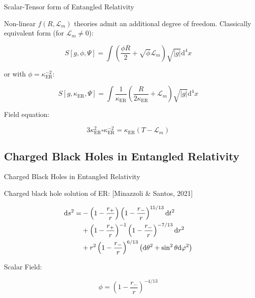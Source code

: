\documentclass{beamer}
\newcommand{\paren}[1]{\left( #1 \right)}
\newcommand{\bracket}[1]{\left[ #1 \right]}
\newcommand{\mrm}{\mathrm}
\newcommand{\mcal}{\mathcal}
\begin{document}
\begin{frame}{Scalar-Tensor form of Entangled Relativity}

    Non-linear $f(R, \mcal L_m)$ theories admit an additional degree of freedom. Classically equivalent form (for $\mcal L_m \neq 0$):

    \begin{equation}
        S\bracket{g, \phi, \Psi} = \int \paren{\frac{\phi R}{2} + \sqrt{\phi}\mcal L_m}\sqrt{|g|}\mrm d^4x
    \end{equation}

    or with $\phi = \kappa^{-2}_\mrm{ER}$:

    \begin{equation}
        S\bracket{g, \kappa_\mrm{ER}, \Psi} = \int \frac{1}{\kappa_\mrm{ER}}\paren{\frac{R}{2\kappa_\mrm{ER}} + \mcal L_m}\sqrt{|g|}\mrm d^4x
    \end{equation}

    Field equation:

    \begin{equation}
        3\kappa_\mrm{ER}^2\square \kappa_\mrm{ER}^{-2} = \kappa_\mrm{ER} \paren{T - \mcal L_m}
    \end{equation}
  
\end{frame}

\subsection{Charged Black Holes in Entangled Relativity}
\begin{frame}{Charged Black Holes in Entangled Relativity}
  
    Charged black hole solution of ER: [Minazzoli \& Santos, 2021]

    \begin{align}
        \mrm ds^2 = &-\paren{1 - \frac{r_+}{r}}\paren{1 - \frac{r_-}{r}}^{15/13}\mrm dt^2 \notag\\
        &+ \paren{1 - \frac{r_+}{r}}^{-1}\paren{1 - \frac{r_-}{r}}^{-7/13}\mrm dr^2 \notag\\
        &+ r^2\paren{1 - \frac{r_-}{r}}^{6/13}\paren{\mrm d\theta^2 + \sin^2\theta \mrm d\varphi^2}
    \end{align}

    Scalar Field:

    \begin{equation}
        \phi = \paren{1 - \frac{r_-}{r}}^{-4/13}
    \end{equation}

\end{frame}
\end{document}
